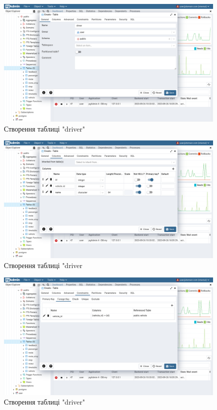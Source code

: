 \documentclass[14pt]{extreport}
\begin{document}
\begin{normalsize}
	\begin{figure}[H]
		\centering
		\includegraphics[scale=0.35]{41}
		\caption{Створення таблиці "driver"}
	\end{figure}
	
	\begin{figure}[H]
		\centering
		\includegraphics[scale=0.35]{42}
		\caption{Створення таблиці "driver}
	\end{figure}
	
	\begin{figure}[H]
		\centering
		\includegraphics[scale=0.35]{43}
		\caption{Створення таблиці "driver"}
	\end{figure}
	

\end{normalsize}
\end{document}
